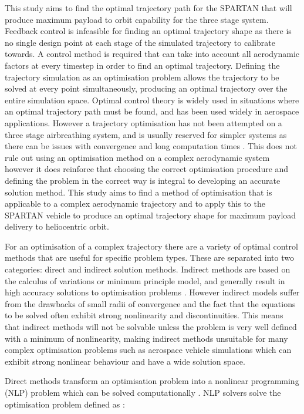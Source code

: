 This study aims to find the optimal trajectory path for the SPARTAN that will produce maximum payload to orbit capability for the three stage system. Feedback control is infeasible for finding an optimal trajectory shape as there is no single design point at each stage of the simulated trajectory to calibrate towards. A control method is required that can take into account all aerodynamic factors at every timestep in order to find an optimal trajectory. Defining the trajectory simulation as an optimisation problem allows the trajectory to be solved at every point simultaneously, producing an optimal trajectory over the entire simulation space. Optimal control theory is widely used in situations where an optimal trajectory path must be found, and has been used widely in aerospace applications. However a trajectory optimisation has not been attempted on a three stage airbreathing system, and is usually reserved for simpler systems as there can be issues with convergence and long computation times \cite{Diehl2006}. This does not rule out using an optimisation method on a complex aerodynamic system however it does reinforce that choosing the correct optimisation procedure and defining the problem in the correct way is integral to developing an accurate solution method. This study aims to find a method of optimisation that is applicable to a complex aerodynamic trajectory and to apply this to the SPARTAN vehicle to produce an optimal trajectory shape for maximum payload delivery to heliocentric orbit.

For an optimisation of a complex trajectory there are a variety of optimal control methods that are useful for specific problem types. These are separated into two categories: direct and indirect solution methods. Indirect methods are based on the calculus of variations or minimum principle model, and generally result in high accuracy solutions to optimisation problems \cite{Bulirsch1993}. However indirect models suffer from the drawbacks of small radii of convergence and the fact that the equations to be solved often exhibit strong nonlinearity and discontinuities. This means that indirect methods will not be solvable unless the problem is very well defined with a minimum of nonlinearity, making indirect methods unsuitable for many complex optimisation problems such as aerospace vehicle simulations which can exhibit strong nonlinear behaviour and have a wide solution space. 

Direct methods transform an optimisation problem into a nonlinear programming (NLP) problem which can be solved computationally \cite{Stryk1992}. NLP solvers solve the optimisation problem defined as \cite{Bazaraa2013}:

